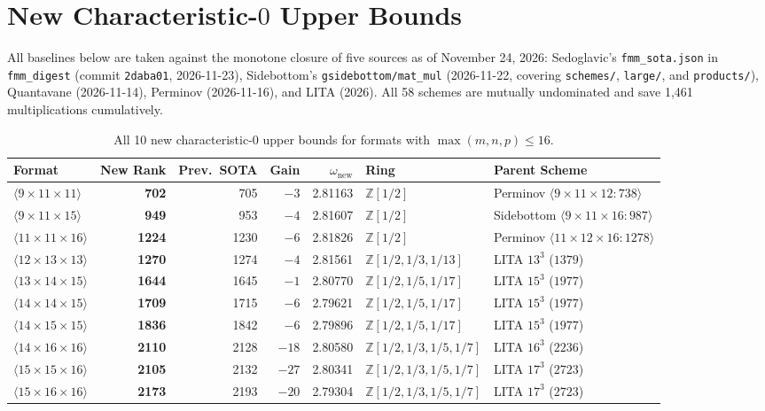\documentclass[11pt,a4paper]{article}
\begin{document}
\section{New Characteristic-\texorpdfstring{$0$}{0} Upper Bounds}
All baselines below are taken against the monotone closure of five sources as of November 24, 2026: Sedoglavic's \texttt{fmm\_sota.json} in \texttt{fmm\_digest} (commit \texttt{2daba01}, 2026-11-23), Sidebottom's \texttt{gsidebottom/mat\_mul} (2026-11-22, covering \texttt{schemes/}, \texttt{large/}, and \texttt{products/}), Quantavane (2026-11-14), Perminov (2026-11-16), and LITA (2026). All 58 schemes are mutually undominated and save 1,461 multiplications cumulatively.

\begin{table}[ht]
\centering
\caption{All 10 new characteristic-$0$ upper bounds for formats with $\max(m,n,p)\le 16$.}
\footnotesize
\setlength{\tabcolsep}{4.5pt}
\begin{tabular}{@{}lrrrrll@{}}
\toprule
Format & New Rank & Prev.\ SOTA & Gain & $\omega_{\text{new}}$ & Ring & Parent Scheme \\
\midrule
$\langle 9\times 11\times 11\rangle$  & \textbf{702}  & 705  & $-3$  & 2.81163 & $\mathbb{Z}[1/2]$ & Perminov $\langle 9\times 11\times 12:738\rangle$ \\
$\langle 9\times 11\times 15\rangle$  & \textbf{949}  & 953  & $-4$  & 2.81607 & $\mathbb{Z}[1/2]$ & Sidebottom $\langle 9\times 11\times 16:987\rangle$ \\
$\langle 11\times 11\times 16\rangle$ & \textbf{1224} & 1230 & $-6$  & 2.81826 & $\mathbb{Z}[1/2]$ & Perminov $\langle 11\times 12\times 16:1278\rangle$ \\
$\langle 12\times 13\times 13\rangle$ & \textbf{1270} & 1274 & $-4$  & 2.81561 & $\mathbb{Z}[1/2,1/3,1/13]$ & LITA $13^3$ ($1379$) \\
$\langle 13\times 14\times 15\rangle$ & \textbf{1644} & 1645 & $-1$  & 2.80770 & $\mathbb{Z}[1/2,1/5,1/17]$ & LITA $15^3$ ($1977$) \\
$\langle 14\times 14\times 15\rangle$ & \textbf{1709} & 1715 & $-6$  & 2.79621 & $\mathbb{Z}[1/2,1/5,1/17]$ & LITA $15^3$ ($1977$) \\
$\langle 14\times 15\times 15\rangle$ & \textbf{1836} & 1842 & $-6$  & 2.79896 & $\mathbb{Z}[1/2,1/5,1/17]$ & LITA $15^3$ ($1977$) \\
$\langle 14\times 16\times 16\rangle$ & \textbf{2110} & 2128 & $-18$ & 2.80580 & $\mathbb{Z}[1/2,1/3,1/5,1/7]$ & LITA $16^3$ ($2236$) \\
$\langle 15\times 15\times 16\rangle$ & \textbf{2105} & 2132 & $-27$ & 2.80341 & $\mathbb{Z}[1/2,1/3,1/5,1/7]$ & LITA $17^3$ ($2723$) \\
$\langle 15\times 16\times 16\rangle$ & \textbf{2173} & 2193 & $-20$ & 2.79304 & $\mathbb{Z}[1/2,1/3,1/5,1/7]$ & LITA $17^3$ ($2723$) \\
\bottomrule
\end{tabular}
\end{table}
\end{document}
